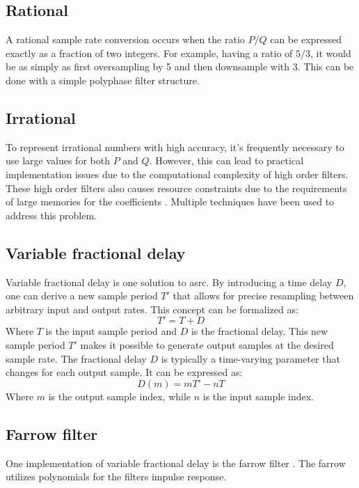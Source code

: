 \subsection{Rational}
A rational sample rate conversion occurs when the ratio $P/Q$ can be expressed exactly as a fraction of two integers. For example, having a ratio of $5/3$, it would be as simply as first oversampling by 5 and then downsample with 3. This can be done with a simple polyphase filter structure. 

\subsection{Irrational}
To represent irrational numbers with high accuracy, it's frequently necessary to use large values for both $P$ and $Q$. However, this can lead to practical implementation issues due to the computational complexity of high order filters. These high order filters also causes resource constraints due to the requirements of large memories for the coefficients \cite{ramstad_digital_1984}. Multiple techniques have been used to address this problem.

\subsection{Variable fractional delay}
Variable fractional delay is one solution to \acrshort{asrc}. By introducing a time delay $D$, one can derive a new sample period $T'$ that allows for precise resampling between arbitrary input and output rates. This concept can be formalized as:
\begin{equation}
    T' = T + D
\end{equation}
Where $T$ is the input sample period and $D$ is the fractional delay. This new sample period $T'$ makes it possible to generate output samples at the desired sample rate. The fractional delay $D$ is typically a time-varying parameter that changes for each output sample. It can be expressed as:
\begin{equation}
    D(m) = mT' - nT
\end{equation}
Where $m$ is the output sample index, while $n$ is the input sample index.



\subsection{Farrow filter}
One implementation of variable fractional delay is the farrow filter \cite{farrow_continuously_1988}. The farrow utilizes polynomials for the filters impulse response. 

